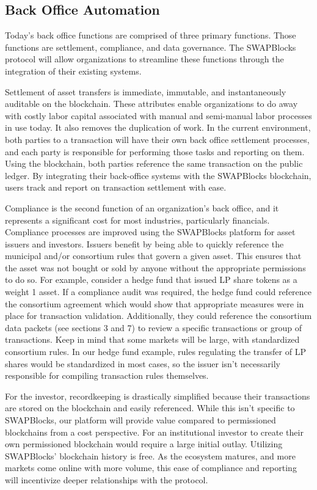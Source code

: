 \documentclass[12pt]{article}
\begin{document}
\subsection{Back Office Automation}
Today’s back office functions are comprised of three primary functions. Those functions are settlement, compliance, and data governance. The SWAPBlocks protocol will allow organizations to streamline these functions through the integration of their existing systems.

Settlement of asset transfers is immediate, immutable, and instantaneously auditable on the blockchain. These attributes enable organizations to do away with costly labor capital associated with manual and semi-manual labor processes in use today. It also removes the duplication of work. In the current environment, both parties to a transaction will have their own back office settlement processes, and each party is responsible for performing those tasks and reporting on them. Using the blockchain, both parties reference the same transaction on the public ledger. By integrating their back-office systems with the SWAPBlocks blockchain, users track and report on transaction settlement with ease.

Compliance is the second function of an organization’s back office, and it represents a significant cost for most industries, particularly financials. Compliance processes are improved using the SWAPBlocks platform for asset issuers and investors. Issuers benefit by being able to quickly reference the municipal and/or consortium rules that govern a given asset. This ensures that the asset was not bought or sold by anyone without the appropriate permissions to do so. For example, consider a hedge fund that issued LP share tokens as a weight 1 asset. If a compliance audit was required, the hedge fund could reference the consortium agreement which would show that appropriate measures were in place for transaction validation. Additionally, they could reference the consortium data packets (see sections 3 and 7) to review a specific transactions or group of transactions. Keep in mind that some markets will be large, with standardized consortium rules. In our hedge fund example, rules regulating the transfer of LP shares would be standardized in most cases, so the issuer isn’t necessarily responsible for compiling transaction rules themselves. 

For the investor, recordkeeping is drastically simplified because their transactions are stored on the blockchain and easily referenced. While this isn’t specific to SWAPBlocks, our platform will provide value compared to permissioned blockchains from a cost perspective. For an institutional investor to create their own permissioned blockchain would require a large initial outlay. Utilizing SWAPBlocks’ blockchain history is free. As the ecosystem matures, and more markets come online with more volume, this ease of compliance and reporting will incentivize deeper relationships with the protocol.
\end{document}
